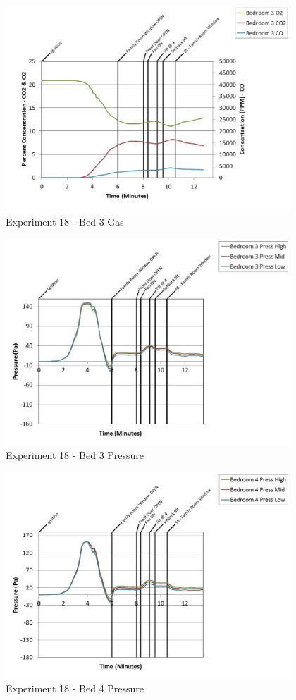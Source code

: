 \documentclass{article}
\begin{document}
\begin{appendices}
	\clearpage

	\begin{figure}[h!]
		\centering
		\includegraphics[height=3.05in]{0_Images/Results_Charts/Exp_18_Charts/Bed3Gas.pdf}
		\caption{Experiment 18 - Bed 3 Gas}
	\end{figure}
 

	\begin{figure}[h!]
		\centering
		\includegraphics[height=3.05in]{0_Images/Results_Charts/Exp_18_Charts/Bed3Pressure.pdf}
		\caption{Experiment 18 - Bed 3 Pressure}
	\end{figure}
 
	\clearpage

	\begin{figure}[h!]
		\centering
		\includegraphics[height=3.05in]{0_Images/Results_Charts/Exp_18_Charts/Bed4Pressure.pdf}
		\caption{Experiment 18 - Bed 4 Pressure}
	\end{figure}
 


\end{appendices}
\end{document}
